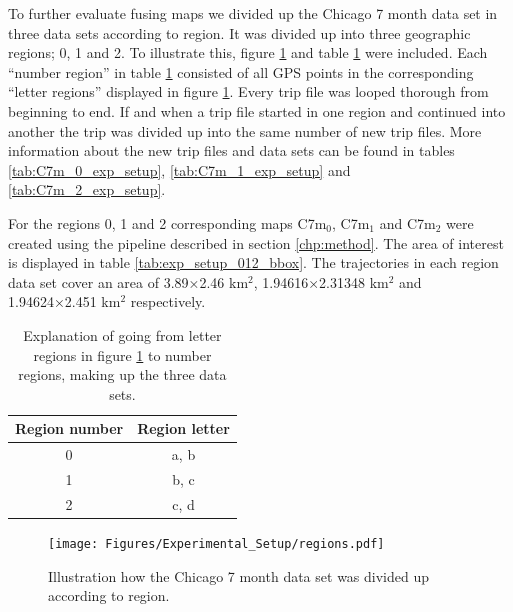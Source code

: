 To further evaluate fusing maps we divided up the Chicago 7 month data set in three data sets according to region. It was divided up into three geographic regions; 0, 1 and 2. To illustrate this, figure \ref{fig:exp_setup/regions} and table \ref{tab:exp_setup:regions} were included. Each ``number region'' in table \ref{tab:exp_setup:regions} consisted of all \ac{GPS} points in the corresponding ``letter regions'' displayed in figure \ref{fig:exp_setup/regions}. Every trip file was looped thorough from beginning to end. If and when a trip file started in one region and continued into another the trip was divided up into the same number of new trip files. More information about the new trip files and data sets can be found in tables \ref{tab:C7m_0_exp_setup}, \ref{tab:C7m_1_exp_setup} and \ref{tab:C7m_2_exp_setup}.

For the regions 0, 1 and 2 corresponding maps C7m$_0$, C7m$_1$ and C7m$_2$ were created using the pipeline described in section \ref{chp:method}. The area of interest is displayed in table \ref{tab:exp_setup_012_bbox}. The trajectories in each region data set cover an area of 3.89×2.46 km$^2$, 1.94616×2.31348 km$^2$ and 1.94624×2.451 km$^2$ respectively.

\begin{table}[H]
\centering
\caption{Explanation of going from letter regions in figure \ref{fig:exp_setup/regions} to number regions, making up the three data sets.}
\label{tab:exp_setup:regions}
\begin{tabular}{cc}
Region number & Region letter \\ \hline
0             & a, b          \\
1             & b, c          \\
2             & c, d          \\ \hline
\end{tabular}
\end{table}

\begin{figure}[H]
    \centering
    \texttt{[image: Figures/Experimental\_Setup/regions.pdf]}
    \caption{Illustration how the Chicago 7 month data set was divided up according to region.}
    \label{fig:exp_setup/regions}
\end{figure}

